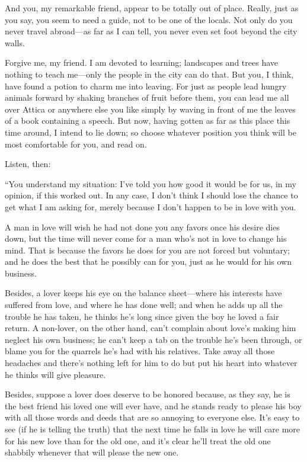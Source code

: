 \sayphaedrus And you, my remarkable friend, appear to be totally out of 
place. Really, just as you say, you seem to need a guide, not to
be one of the locals. Not only do you never travel abroad---as far as I
can tell, you never even set foot beyond the city walls.

\saysocrates Forgive me, my friend. I am devoted to learning; landscapes
and trees have nothing to teach me---only the people in the city can do
that. But you, I think, have found a potion to charm me into leaving.
For just as people lead hungry animals forward by shaking
branches of fruit before them, you can lead me all over Attica or
anywhere else you like simply by waving in front of me the leaves of a
book containing a speech. But now, having gotten as far as this place
this time around, I intend to lie down; so choose whatever position you
think will be most comfortable for you, and read on.

\sayphaedrus Listen, then:

“You understand my situation: I’ve told you how good it would be for us,
in my opinion, if this worked out. In any case, I don’t think I should 
lose the chance to get what I am asking for, merely
because I don’t happen to be in love with you.

A man in love will wish he had not done you any favors once his desire
dies down, but the time will never come for a man who’s not in love to
change his mind. That is because the favors he does for you are not
forced but voluntary; and he does the best that he possibly can for you,
just as he would for his own business.

Besides, a lover keeps his eye on the balance sheet---where his
interests have suffered from love, and where he has done well; and when
he adds up all the trouble he has taken, he thinks he’s long since given
the boy he loved a fair return. A non-lover, on the other hand,
can’t complain about love’s making him neglect his own business; he
can’t keep a tab on the trouble he’s been through, or blame you for the
quarrels he’s had with his relatives. Take away all those headaches and
there’s nothing left for him to do but put his heart into whatever he
thinks will give pleasure.

Besides, suppose a lover does deserve to be honored because, as they 
say, he is the best friend his loved one will ever have, and he
stands ready to please his boy with all those words and deeds that are
so annoying to everyone else. It’s easy to see (if he is telling the
truth) that the next time he falls in love he will care more for his new
love than for the old one, and it’s clear he’ll treat the old one
shabbily whenever that will please the new one.

